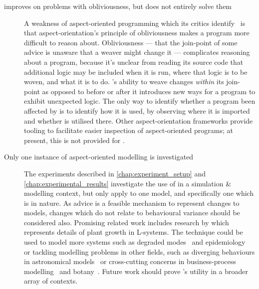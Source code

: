 \begin{description}

  \item[\pdsf{} improves on problems with obliviousness, but does not entirely
    solve them] A weakness of aspect-oriented programming which its critics
    identify~\cite{steimann06paradoxical,Constantinides04aopconsidered,przybylek2010wrong}
    is that aspect-orientation's principle of obliviousness makes a program more
    difficult to reason about. Obliviousness --- that the join-point of some
    advice is unaware that a weaver might change it --- complicates reasoning
    about a program, because it's unclear from reading its source code that
    additional logic may be included when it is run, where that logic is to be
    woven, and what it is to do. \pdsf{}'s ability to weave changes
    \emph{within} its join-point as opposed to before or after it introduces new
    ways for a program to exhibit unexpected logic. The only way to identify
    whether a program been affected by \pdsf{} is to identify how it is used, by
    observing where it is imported and whether \pdsf{} is utilised there. Other
    aspect-orientation frameworks provide tooling to facilitate easier
    inspection of aspect-oriented programs; at present, this is not provided for
    \pdsf{}.

  \item[Only one instance of aspect-oriented modelling is investigated]
    The experiments described in \cref{chap:experiment_setup} and
    \cref{chap:experimental_results} investigate the use of \aop{} in a
    simulation \& modelling context, but only apply \aspectorientation{} to one
    model, and specifically one which is \sociotechnical{} in nature. As advice
    is a feasible mechanism to represent changes to models, changes which do not
    relate to behavioural variance should be considered also. Promising related
    work includes research by \citet{Cieslak_2011} which represents details of
    plant growth in \aspectoriented{} L-systems. The technique could be used to
    model more \sociotechnical{} systems such as degraded
    modes~\cite{johnson2007degradedmodes} and
    epidemiology~\cite{aranTheatreThesis} or tackling modelling problems in
    other fields, such as diverging behaviours in astronomical
    models~\cite{comparison_of_galaxy_formation_models,comparison_of_radiative_models_of_galaxies}
    or cross-cutting concerns in business-process
    modelling~\cite{Cappelli_AOBPM,da2020implementation} and
    botany~\cite{Cieslak_2011}. Future work should prove \aop{}'s utility in
    a broader array of contexts.


\end{description}
